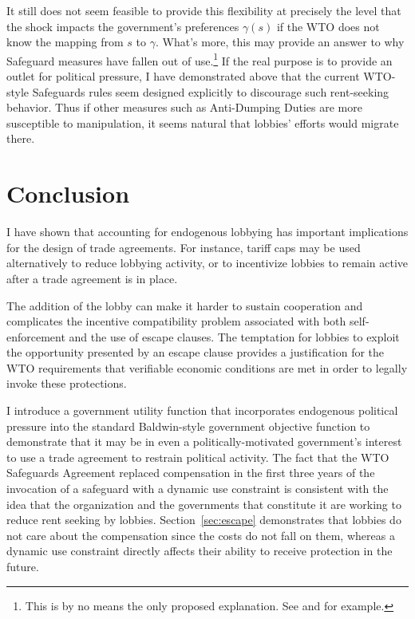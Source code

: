 \documentclass[12pt,titlepage]{article}
\newcommand{\ga}{\gamma}
\begin{document}
It still does not seem feasible to provide this flexibility at precisely the level that the shock impacts the government's preferences $\ga(s)$ if the WTO does not know the mapping from $s$ to $\ga$. What's more, this may provide an answer to why Safeguard measures have fallen out of use.\footnote{This is by no means the only proposed explanation. See \Textcite{bown2002s} and \Textcite{sykes2003} for example.} If the real purpose is to provide an outlet for political pressure, I have demonstrated above that the current WTO-style Safeguards rules seem designed explicitly to discourage such rent-seeking behavior. Thus if other measures such as Anti-Dumping Duties are more susceptible to manipulation, it seems natural that lobbies' efforts would migrate there.

	


%

\section{Conclusion}
\label{sec:concl}
I have shown that accounting for endogenous lobbying has important implications for the design of trade agreements. For instance, tariff caps may be used alternatively to reduce lobbying activity, or to incentivize lobbies to remain active after a trade agreement is in place.

The addition of the lobby can make it harder to sustain cooperation and complicates the incentive compatibility problem associated with both self-enforcement and the use of escape clauses. The temptation for lobbies to exploit the opportunity presented by an escape clause provides a justification for the WTO requirements that verifiable economic conditions are met in order to legally invoke these protections.

I introduce a government utility function that incorporates endogenous political pressure into the standard Baldwin-style government objective function to demonstrate that it may be in even a politically-motivated government's interest to use a trade agreement to restrain political activity. The fact that the WTO Safeguards Agreement replaced compensation in the first three years of the invocation of a safeguard with a dynamic use constraint is consistent with the idea that the organization and the governments that constitute it are working to reduce rent seeking by lobbies. Section~\ref{sec:escape} demonstrates that lobbies do not care about the compensation since the costs do not fall on them, whereas a dynamic use constraint directly affects their ability to receive protection in the future.
\end{document}
